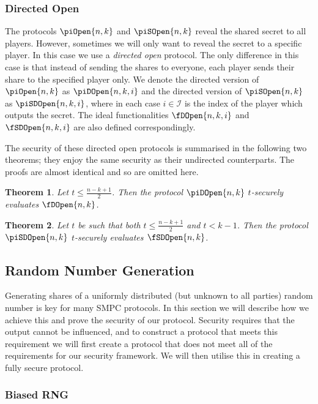 \documentclass{article}
\newtheorem{theorem}{Theorem}
\theoremstyle{remark}
\begin{document}
\subsubsection{Directed Open}

The protocols $\piOpen{n,k}$ and $\piSOpen{n,k}$ reveal the shared secret to
all players. However, sometimes we will only want to reveal the secret to a
specific player. In this case we use a \textit{directed open} protocol. The
only difference in this case is that instead of sending the shares to everyone,
each player sends their share to the specified player only. We denote the
directed version of $\piOpen{n,k}$ as $\piDOpen{n,k,i}$ and the directed
version of $\piSOpen{n,k}$ as $\piSDOpen{n,k,i}$, where in each case $i \in
\mathcal{I}$ is the index of the player which outputs the secret. The ideal
functionalities $\fDOpen{n,k,i}$ and $\fSDOpen{n,k,i}$ are also defined
correspondingly.

The security of these directed open protocols is summarised in the following
two theorems; they enjoy the same security as their undirected counterparts.
The proofs are almost identical and so are omitted here.

\begin{theorem}
	Let $t \le \frac{n - k + 1}{2}$. Then the protocol $\piDOpen{n,k}$
	$t$-securely evaluates $\fDOpen{n,k}$.
\end{theorem}

\begin{theorem}
	Let $t$ be such that both $t \le \frac{n - k + 1}{2}$ and $t < k - 1$. Then
	the protocol $\piSDOpen{n,k}$ $t$-securely evaluates $\fSDOpen{n,k}$.
\end{theorem}

\subsection{Random Number Generation}\label{sec:rng}

Generating shares of a uniformly distributed (but unknown to all parties)
random number is key for many SMPC protocols. In this section we will describe
how we achieve this and prove the security of our protocol. Security requires
that the output cannot be influenced, and to construct a protocol that meets
this requirement we will first create a protocol that does not meet all of the
requirements for our security framework. We will then utilise this in creating
a fully secure protocol.

\subsubsection{Biased RNG}
\end{document}
